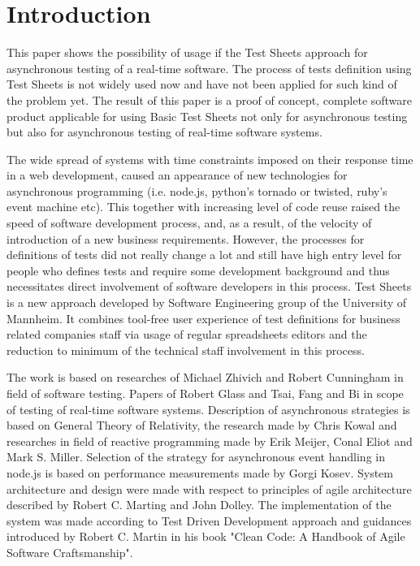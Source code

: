 \chapter{Introduction}
\label{chap:intro}
This paper shows the possibility of usage if the Test Sheets approach for asynchronous testing of a real-time software. The process of tests definition using Test Sheets is not widely used now and have not been applied for such kind of the problem yet. 
The result of this paper is a proof of concept, complete software product applicable for using Basic Test Sheets not only for asynchronous testing but also for asynchronous testing of real-time software systems.

The wide spread of systems with time constraints imposed on their response time in a web development, caused an appearance of new technologies for asynchronous programming (i.e. node.js, python's tornado or twisted, ruby's event machine etc). This together with increasing level of code reuse raised the speed of software development process, and, as a result, of the velocity of introduction of a new business requirements. However, the processes for definitions of tests did not really change a lot and still have high entry level for people who defines tests and require some development background and thus necessitates direct involvement of software developers in this process. Test Sheets is a new approach developed by Software Engineering group of the University of Mannheim. It combines  tool-free user experience of test definitions for business related companies staff via usage of regular spreadsheets editors and the reduction to minimum of the technical staff involvement in this process.


The work is based on researches of Michael Zhivich and Robert Cunningham in field of software testing. Papers of Robert Glass and Tsai, Fang  and Bi in scope of testing of real-time software systems. Description of asynchronous strategies is based on General Theory of Relativity, the research made by Chris Kowal and researches in field of reactive programming made by Erik Meijer, Conal Eliot and Mark S. Miller. Selection of the strategy for asynchronous event handling in node.js is based on  performance measurements made by Gorgi Kosev. System  architecture and design were made with respect to principles of agile architecture described by Robert  C. Marting and John Dolley. The implementation of the system was made according to Test Driven Development approach and guidances introduced by Robert C. Martin in his book "Clean Code: A Handbook of Agile Software Craftsmanship".


